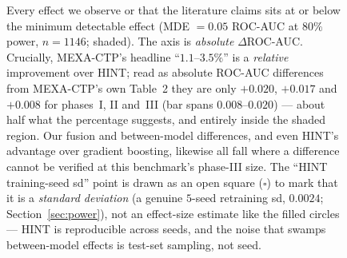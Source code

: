 \documentclass[a4paper,fleqn]{cas-sc}
\begin{document}
\begin{figure}[htbp]
\centering
{}
\caption{Every effect we observe or that the literature claims sits at or below the minimum
detectable effect (MDE $=0.05$ ROC-AUC at $80\%$ power, $n{=}1146$; shaded). The axis is
\emph{absolute} $\Delta$ROC-AUC. Crucially, MEXA-CTP's headline ``$1.1$--$3.5\%$'' is a
\emph{relative} improvement over HINT; read as absolute ROC-AUC differences from MEXA-CTP's own
Table~2 they are only $+0.020$, $+0.017$ and $+0.008$ for phases~I, II and~III (bar spans
$0.008$--$0.020$) --- about half what the percentage suggests, and entirely inside the shaded
region. Our fusion and between-model differences, and even HINT's advantage over gradient
boosting, likewise all fall where a difference cannot be verified at this benchmark's phase-III
size. The ``HINT training-seed sd'' point is drawn as an open square ($\square$) to mark that it is
a \emph{standard deviation} (a genuine $5$-seed retraining sd, $0.0024$; Section~\ref{sec:power}),
not an effect-size estimate like the filled circles --- HINT is reproducible across seeds, and the
noise that swamps between-model effects is test-set sampling, not seed.}
\label{fig:noisefloor}
\end{figure}
\end{document}
